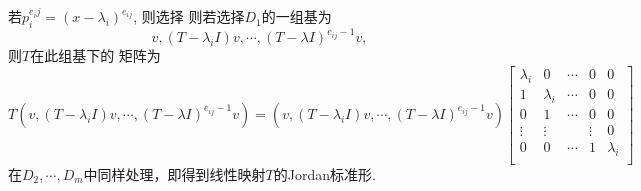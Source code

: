 若$p_i^{e_ij} = (x-\lambda_i)^{e_{ij}}$, 
则选择
则若选择$D_1$的一组基为
$$v, (T-\lambda_i I)v, \cdots, (T-\lambda I)^{e_{ij}-1}v,$$
则$T$在此组基下的
矩阵为
\begin{equation}
T(v, (T-\lambda_i I)v, \cdots, (T-\lambda I)^{e_{ij}-1}v)
= (v, (T-\lambda_i I)v, \cdots, (T-\lambda I)^{e_{ij}-1}v)
\begin{bmatrix}
	\lambda_i& 0& \cdots &0 &0 \\
	1& \lambda_i& \cdots &0 &0\\
	0& 1& \cdots &0 & 0\\
	\vdots& \vdots& &\vdots& 0\\
	0& 0& \cdots& 1& \lambda_i\\
\end{bmatrix}
\end{equation}
在$D_2, \cdots, D_m$中同样处理，即得到线性映射$T$的Jordan标准形.
